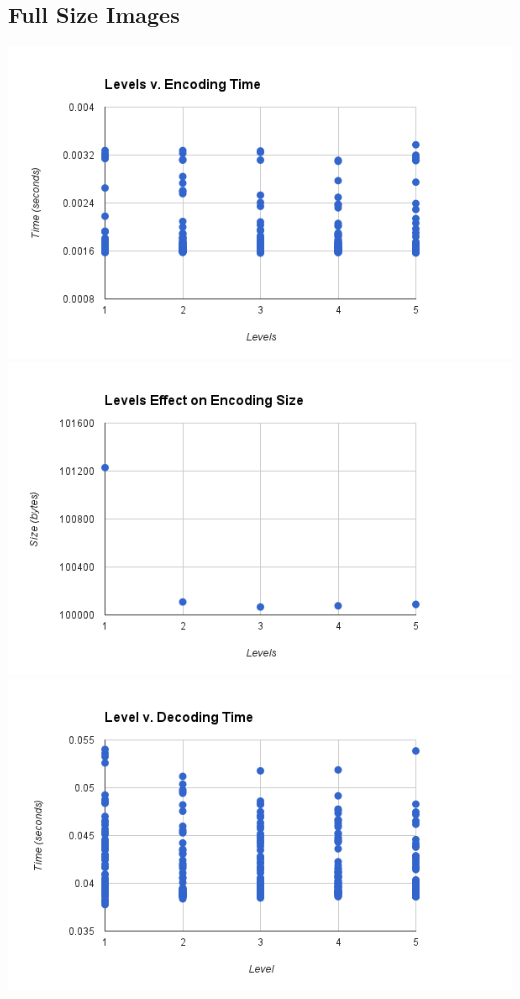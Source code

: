 \documentclass{article}
\begin{document}


\noindent \subsection{Full Size Images}
\includegraphics[scale=0.8]{images/betterlevel_v_encode}\\
\includegraphics[scale=0.8]{images/lvl_encodingsize}\\
\includegraphics[scale=0.8]{images/betterlevel_v_decode}\\
\end{document}
